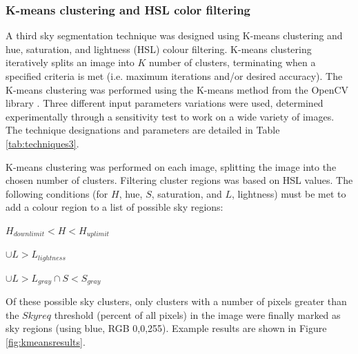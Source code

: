 \documentclass[final,3p,times,authoryear]{elsarticle}
\begin{document}
\subsubsection{K-means clustering and HSL color filtering}\label{sec:kmeans}
A third sky segmentation technique was designed using K-means clustering and hue, saturation, and lightness (HSL) colour filtering. K-means clustering iteratively splits an image into $K$ number of clusters, terminating when a specified criteria is met (i.e. maximum iterations and/or desired accuracy). The K-means clustering was performed using the K-means method from the OpenCV library \citep{Bradski2000}. Three different input parameters variations were used, determined experimentally through a sensitivity test to work on a wide variety of images. The technique designations and parameters are detailed in Table \ref{tab:techniques3}. 

K-means clustering was performed on each image, splitting the image into the chosen number of clusters. Filtering cluster regions was based on HSL values. The following conditions (for $H$, hue, $S$, saturation, and $L$, lightness) must be met to add a colour region to a list of possible sky regions: 

$H_{downlimit} < H < H_{uplimit}$

$\cup L > L_{lightness}$

$\cup L > L_{gray} \cap S < S_{gray}$

Of these possible sky clusters, only clusters with a number of pixels greater than the $Skyreq$ threshold (percent of all pixels) in the image were finally marked as sky regions (using blue, RGB 0,0,255). Example results are shown in Figure \ref{fig:kmeansresults}. 
\end{document}
